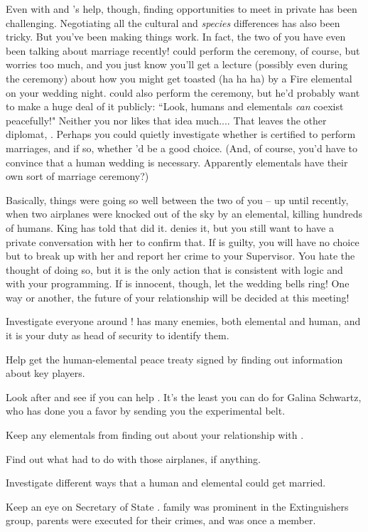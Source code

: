 \documentclass[char]{elementals}
\begin{document}
Even with \cLeader{} and \cDiplomat{}'s help, though, finding opportunities to meet \cJuliet{} in private has been challenging.  Negotiating all the cultural and \emph{species} differences has also been tricky.   But you've been making things work.  In fact, the two of you have even been talking about marriage recently!  \cLeader{} could perform the ceremony, of course, but  \cLeader{\they} worries too much, and you just know you'll get a lecture (possibly even during the ceremony) about how you might get toasted (ha ha ha) by a Fire elemental on your wedding night.  \cDiplomat{} could also perform the ceremony, but he'd probably want to make a huge deal of it publicly: ``Look, humans and elementals \emph{can} coexist peacefully!"  Neither you nor \cJuliet{} likes that idea much....  That leaves the other diplomat, \cAvatar{\full}.  Perhaps you could quietly investigate whether \cAvatar{\they} is certified to perform marriages, and if so, whether \cAvatar{\they}'d be a good choice.  (And, of course, you'd have to convince \cJuliet{} that a human wedding is necessary.  Apparently elementals have their own sort of marriage ceremony?)

Basically, things were going so well between the two of you -- up until recently, when two airplanes were knocked out of the sky by an elemental, killing hundreds of humans.  King \cKing{} has told \cLeader{} that \cJuliet{} did it.  \cJuliet{\They} denies it, but you still want to have a private conversation with her to confirm that.  If \cJuliet{\they} is guilty, you will have no choice but to break up with her and report her crime to your Supervisor.  You hate the thought of doing so, but it is the only action that is consistent with logic and with your programming.  If \cJuliet{} is innocent, though, let the wedding bells ring!  One way or another, the future of your relationship will be decided at this meeting!




\begin{itemz}[Goals]
  \item Investigate everyone around \cLeader{\full}!  \cLeader{\They} has many enemies, both elemental and human, and it is your duty as head of security to identify them.
  \item Help \cLeader{} get the human-elemental peace treaty signed by finding out information about key players.
  \item Look after \cScientist{\full} and see if you can help \cScientist{\them}.  It's the least you can do for Galina Schwartz, who has done you a favor by sending you the experimental belt.
  \item Keep any elementals from finding out about your relationship with \cJuliet{}.
  \item Find out what \cJuliet{} had to do with those airplanes, if anything.
  \item Investigate different ways that a human and elemental could get married.
  \item Keep an eye on Secretary of State \cDema{\full}.  \cDema{\Their} family was prominent in the Extinguishers group, \cDema{\their} parents were executed for their crimes, and 
  \cDema{\they} \cDema{\themself} was once a member.
\end{itemz}
\end{document}
